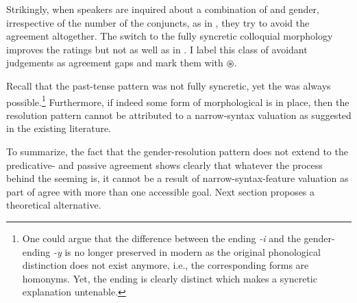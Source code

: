 \documentclass[output=paper,modfontsnewtxmath,hidelinks]{langscibook}
\begin{document}
\noindent Strikingly, when speakers are inquired about a combination of   and  gender, irrespective of the number of the conjuncts, as in , they try to avoid the agreement altogether. The switch to the fully syncretic colloquial morphology improves the ratings but not as well as in . I label this class of avoidant judgements as agreement gaps and mark them with $\circledast$.

\ea\label{gaps}
\smallskip
{}
\z\z

\noindent Recall that the past-tense pattern was not fully syncretic, yet the  was always possible.\footnote{One could argue that the difference between the  ending \textit{-i} and the gender- ending \textit{-y} is no longer preserved in modern  as the original phonological distinction does not exist anymore, i.e., the corresponding  forms are homonyms. Yet, the   ending is clearly distinct which makes a syncretic explanation untenable.}
 Furthermore, if indeed some form of morphological  is in place, then the resolution pattern cannot be attributed to a narrow-syntax valuation as suggested in the existing literature. 
 
To summarize, the fact that the gender-resolution pattern does not extend to the predicative- and passive agreement shows clearly that whatever the process behind the seeming  is, it cannot be a result of narrow-syntax-feature valuation as part of agree with more than one accessible goal. Next section proposes a theoretical alternative.
\end{document}
